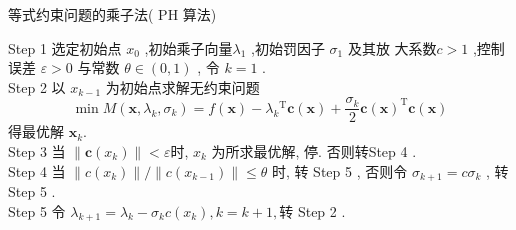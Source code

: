 \documentclass[cn]{elegantbook}
\begin{document}
\begin{algorithm}
\begin{center}
  \Large 等式约束问题的乘子法(  $\mathrm{PH}$  算法)
\end{center}

Step 1 选定初始点 $ x_{0}$  ,初始乘子向量$  \lambda_{1}$  ,初始罚因子  $\sigma_{1}$  及其放 大系数$  c>1 $ ,控制误差 $ \varepsilon>0$  与常数  $\theta \in(0,1)$ , 令  $k=1$ .\\
Step 2 以  $x_{k-1} $ 为初始点求解无约束问题
$$
\min M\left(\boldsymbol{x}, \lambda_{k}, \sigma_{k}\right)=f(\boldsymbol{x})-\lambda_{k}{ }^{\mathrm{T}} \boldsymbol{c}(\boldsymbol{x})+\frac{\sigma_{k}}{2} \boldsymbol{c}(\boldsymbol{x})^{\mathrm{T}} \boldsymbol{c}(\boldsymbol{x})
$$
得最优解  $\boldsymbol{x}_{k} $.\\
Step 3 当 $ \left\|\boldsymbol{c}\left(x_{k}\right)\right\|<\varepsilon  $时,  $x_{k} $ 为所求最优解, 停. 否则转Step 4 .\\
Step 4 当  $\left\|c\left(x_{k}\right)\right\| /\left\|c\left(x_{k-1}\right)\right\| \leqslant \theta $ 时, 转 Step 5 , 否则令 $ \sigma_{k+1}=c \sigma_{k}$ , 转 Step 5 .\\
 Step 5 令 $\lambda_{k+1}=\lambda_{k}-\sigma_{k} c\left(x_{k}\right), k=k+1 , $转 Step  2 .
\end{algorithm}
\end{document}

